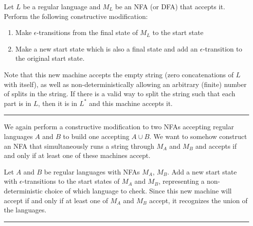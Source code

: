 \documentclass[twoside]{article}
\newenvironment{proof}{{\bf Proof:}}{\hfill\rule{2mm}{2mm}}
\begin{document}
	
	\begin{proof}
		
		
		
		Let $L$ be a regular language and $M_L$ be an NFA (or DFA) that accepts it.  Perform the following constructive modification:
		
		\begin{enumerate}
			\item Make $\epsilon$-transitions from the final state of $M_L$ to the start state
			\item Make a new start state which is also a final state and add an $\epsilon$-transition to the original start state.			
			
		\end{enumerate}
		
		Note that this new machine accepts the empty string (zero concatenations of $L$ with itself), as well as non-deterministically allowing an arbitrary (finite) number of splits in the string.  If there is a valid way to split the string such that each part is in $L$, then it is in $L^*$ and this machine accepts it.
		
	\end{proof}




We again perform a constructive modification to two NFAs accepting regular languages $A$ and $B$ to build one accepting $A\cup B$.  We want to somehow construct an NFA that simultaneously runs a string through $M_A$ and $M_B$ and accepts if and only if at least one of these machines accept.

\begin{proof}
	
	Let $A$ and $B$ be regular languages with NFAs $M_A$, $M_B$.  Add a new start state with $\epsilon$-transitions to the start states of $M_A$ and $M_B$, representing a non-deterministic choice of which language to check.  Since this new machine will accept if and only if at least one of $M_A$ and $M_B$ accept, it recognizes the union of the languages.
	
	
	
\end{proof}
\end{document}
